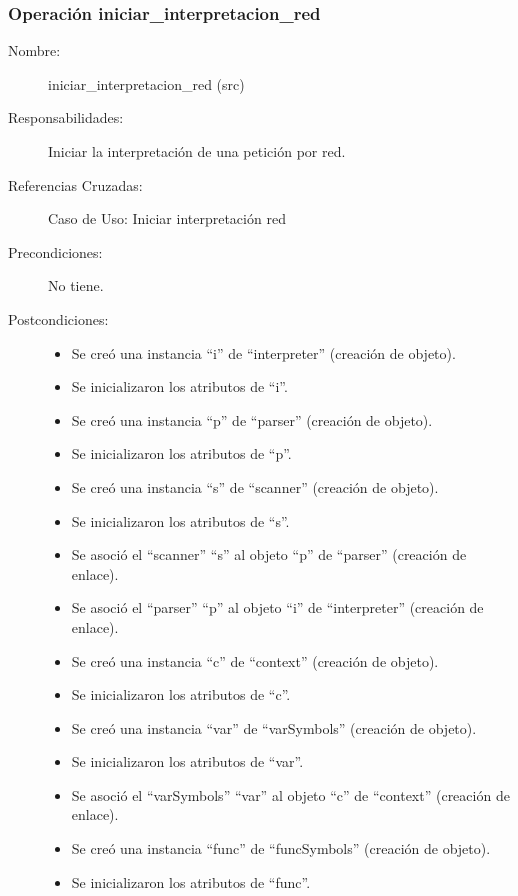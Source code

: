 \subsubsection{Operación iniciar\_interpretacion\_red}
\FloatBarrier
\begin{framed}
	\begin{description}
		\item [Nombre:] iniciar\_interpretacion\_red (src)
		\item [Responsabilidades:] Iniciar la interpretación de una petición por red.
		\item [Referencias Cruzadas: ] Caso de Uso: Iniciar interpretación red
      \item [Precondiciones:] No tiene.
      \item [Postcondiciones:] \hfill
      \begin {itemize}
         \item Se creó una instancia ``i'' de ``interpreter'' (creación de objeto).
         \item Se inicializaron los atributos de ``i''.
         \item Se creó una instancia ``p'' de ``parser'' (creación de objeto).
         \item Se inicializaron los atributos de ``p''.
         \item Se creó una instancia ``s'' de ``scanner'' (creación de objeto).
         \item Se inicializaron los atributos de ``s''.
         \item Se asoció el ``scanner'' ``s'' al objeto ``p'' de ``parser'' (creación de enlace).
         \item Se asoció el ``parser'' ``p'' al objeto ``i'' de ``interpreter'' (creación de enlace).
         \item Se creó una instancia ``c'' de ``context'' (creación de objeto).
         \item Se inicializaron los atributos de ``c''.
         \item Se creó una instancia ``var'' de ``varSymbols'' (creación de objeto).
         \item Se inicializaron los atributos de ``var''.
         \item Se asoció el ``varSymbols'' ``var'' al objeto ``c'' de ``context'' (creación de enlace).
         \item Se creó una instancia ``func'' de ``funcSymbols'' (creación de objeto).
         \item Se inicializaron los atributos de ``func''.

\end{itemize}
\end{description}
\end{framed}

